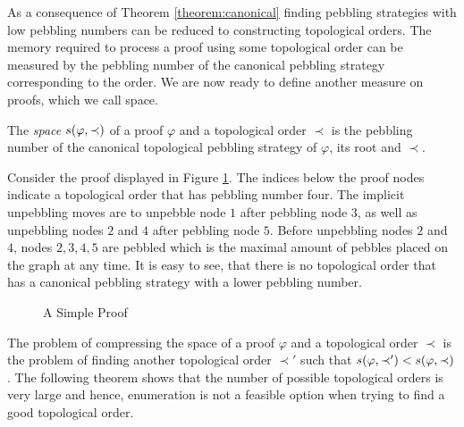 As a consequence of Theorem \ref{theorem:canonical} finding pebbling strategies with low pebbling numbers can be reduced to constructing topological orders.
The memory required to process a proof using some topological order can be measured by the pebbling number of the canonical pebbling strategy corresponding to the order.
We are now ready to define another measure on proofs, which we call space.

\begin{definition}
\label{def:space measure}
The \emph{space} $s(\varphi,\prec)$ 
of a proof $\varphi$ and a topological order $\prec$ is the pebbling number of the canonical topological pebbling strategy of $\varphi$, its root and $\prec$.
\end{definition}

\begin{example}

Consider the proof displayed in Figure \ref{fig:spaceproof}.
The indices below the proof nodes indicate a topological order that has pebbling number four.
The implicit unpebbling moves are to unpebble node $1$ after pebbling node $3$, as well as unpebbling nodes $2$ and $4$ after pebbling node $5$.
Before unpebbling nodes $2$ and $4$, nodes $2,3,4,5$ are pebbled which is the maximal amount of pebbles placed on the graph at any time.
It is easy to see, that there is no topological order that has a canonical pebbling strategy with a lower pebbling number.

\begin{figure}[!h]

\caption{A Simple Proof}
\label{fig:spaceproof}
\end{figure}

\end{example}

The problem of compressing the space of a proof $\varphi$ and a topological order $\prec$ is the problem of finding another topological order $\prec'$ such that $s(\varphi,\prec') < s(\varphi,\prec)$. The following theorem shows that the number of possible topological orders is very large and hence, enumeration is not a feasible option when trying to find a good topological order.

